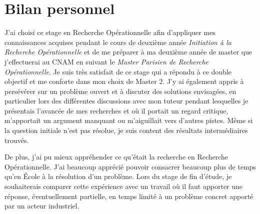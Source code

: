 \chapter*{Bilan personnel}

J'ai choisi ce stage en Recherche Opérationnelle afin d'appliquer mes connaissances acquises pendant le cours de deuxième année \emph{Initiation à la Recherche Opérationnelle} et de me préparer à ma deuxième année de master que j'effectuerai au CNAM en suivant le \emph{Master Parisien de Recherche Opérationnelle}. Je suis très satisfait de ce stage qui a répondu à ce double objectif et me conforte dans mon choix de Master 2. J'y ai également appris à persévérer sur un problème ouvert et à discuter des solutions envisagées, en particulier lors des différentes discussions avec mon tuteur pendant lesquelles je présentais l'avancée de mes recherches et où il portait un regard critique, m'apportait un argument manquant ou m'aiguillait vers d'autres pistes. Même si la question initiale n'est pas résolue, je suis content des résultats intermédiaires trouvés.

De plus, j'ai pu mieux appréhender ce qu'était la recherche en Recherche Opérationnelle. J'ai beaucoup apprécié pouvoir consacrer beaucoup plus de temps qu'en \'Ecole à la résolution d'un problème. Lors du stage de fin d'étude, je souhaiterais comparer cette expérience avec un travail où il faut apporter une réponse, éventuellement partielle, en temps limité à un problème concret apporté par un acteur industriel.

